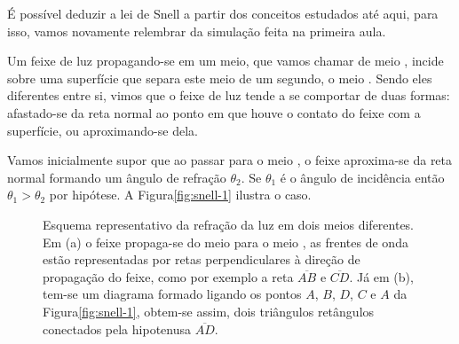 É possível deduzir a lei de Snell a partir dos conceitos estudados até aqui, para isso, vamos novamente relembrar da simulação feita na primeira aula.

Um feixe de luz propagando-se em um meio, que vamos chamar de meio , incide sobre uma superfície que separa este meio de um segundo, o meio . Sendo eles diferentes entre si, vimos que o feixe de luz tende a se comportar de duas formas: afastado-se da reta normal ao ponto em que houve o contato do feixe com a superfície, ou aproximando-se dela.

Vamos inicialmente supor que ao passar para o meio , o feixe aproxima-se da reta normal formando um ângulo de refração $\theta_2$. Se $\theta_1$ é o ângulo de incidência então $\theta_1>\theta_2$ por hipótese. A Figura\autoref{fig:snell-1} ilustra o caso.

\vspace{5pt}
\begin{figure}[!ht]        
    \centering              
    \hspace{20pt}
    \caption{Esquema representativo da refração da luz em dois meios diferentes. Em (a) o feixe propaga-se do meio  para o meio , as frentes de onda estão representadas por retas perpendiculares à direção de propagação do feixe, como por exemplo a reta $\overline{AB}$ e $\overline{CD}$. Já em (b), tem-se um diagrama formado ligando os pontos $A$, $B$, $D$, $C$ e $A$ da Figura\autoref{fig:snell-1}, obtem-se assim, dois triângulos retângulos conectados pela hipotenusa $\overline{AD}$.}
    \label{fig:snell}
  \end{figure}        
  \vspace*{20pt}
  
